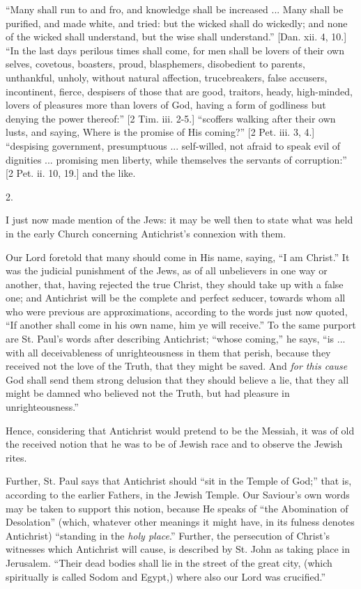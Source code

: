 ``Many shall run to and fro, and knowledge shall be increased
... Many shall be purified, and made white, and tried: but the wicked
shall do wickedly; and none of the wicked shall understand, but the
wise shall understand.'' [Dan. xii. 4, 10.] ``In the last days
perilous times shall come, for men shall be lovers of their own
selves, covetous, boasters, proud, blasphemers, disobedient to
parents, unthankful, unholy, without natural affection, trucebreakers,
false accusers, incontinent, fierce, despisers of those that are good,
traitors, heady, high-minded, lovers of pleasures more than lovers of
God, having a form of godliness but denying the power thereof:''
[2 Tim. iii. 2-5.] ``scoffers walking after their own lusts, and
saying, Where is the promise of His coming?'' [2 Pet. iii. 3, 4.]
``despising government, presumptuous ... self-willed, not afraid
to speak evil of dignities ... promising men liberty, while themselves
the servants of corruption:'' [2 Pet. ii. 10, 19.] and the like.

2.

I just now made mention of the Jews: it may be well then to
state what was held in the early Church concerning Antichrist's
connexion with them.

Our Lord foretold that many should come in His name, saying,
``I am Christ.'' It was the judicial punishment of the Jews,
as of all unbelievers in one way or another, that, having rejected the
true Christ, they should take up with a false one; and Antichrist will
be the complete and perfect seducer, towards whom all who were
previous are approximations, according to the words just now quoted,
``If another shall come in his own name, him ye will
receive.'' To the same purport are St. Paul's words after
describing Antichrist; ``whose coming,'' he says, ``is ...
with all deceivableness of unrighteousness in them that perish,
because they received not the love of the Truth, that they might be
saved. And \emph{for this cause} God shall send them strong delusion
that they should believe a lie, that they all might be damned who
believed not the Truth, but had pleasure in unrighteousness.''

Hence, considering that Antichrist would pretend to be the Messiah,
it was of old the received notion that he was to be of Jewish race and
to observe the Jewish rites.

Further, St. Paul says that Antichrist should ``sit in the
Temple of God;'' that is, according to the earlier Fathers, in the
Jewish Temple. Our Saviour's own words may be taken to support this
notion, because He speaks of ``the Abomination of Desolation''
(which, whatever other meanings it might have, in its fulness denotes
Antichrist) ``standing in the \emph{holy place}.'' Further,
the persecution of Christ's witnesses which Antichrist will cause, is
described by St. John as taking place in Jerusalem. ``Their dead
bodies shall lie in the street of the great city, (which spiritually
is called Sodom and Egypt,) where also our Lord was crucified.''


